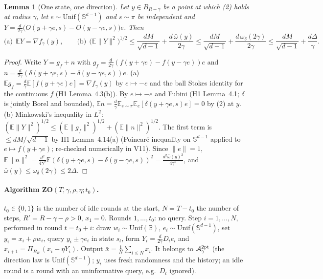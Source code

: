 \documentclass[11pt,a4paper]{article}
\numberwithin{equation}{section}
\newtheorem{lemma}[theorem]{Lemma}
\theoremstyle{definition}
\theoremstyle{remark}
\newcommand{\E}{\mathbb E}\newcommand{\R}{\mathbb R}\newcommand{\Z}{\mathbb Z}\newcommand{\Prob}{\mathbb P}
\newcommand{\norm}[1]{\lVert #1\rVert}\newcommand{\abs}[1]{\lvert #1\rvert}\newcommand{\ip}[2]{\langle #1,#2\rangle}
\newcommand{\Unif}{\mathrm{Unif}}\newcommand{\TV}{\mathrm{TV}}\newcommand{\BC}{\mathrm{BC}}\newcommand{\tmix}{t_{\rm mix}}
\newcommand{\Sph}{\mathbb S^{d-1}}\newcommand{\Ball}{\mathbb B}\newcommand{\iid}{\mathrm{iid}}
\newcommand{\wbar}{\bar\omega}\newcommand{\Atwo}{\cA^{\rm 2pt}_\gamma}
\begin{document}
\begin{lemma}[One state, one direction]\label{lem:mom}
Let $y\in B_{R-\gamma}$ be a point at which (2) holds at radius $\gamma$, let $e\sim\Unif(\Sph)$ and $s\sim\pi$ be independent and $Y=\frac d{2\gamma}\big(O(y+\gamma e,s)-O(y-\gamma e,s)\big)e$. Then
\[
\text{(a)}\ \ \E Y=\nabla f_\gamma(y),\qquad\text{(b)}\ \ \big(\E\norm Y^2\big)^{1/2}\le\frac{dM}{\sqrt{d-1}}+\frac{d\,\wbar(y)}{2\gamma}\le\frac{dM}{\sqrt{d-1}}+\frac{d\,\omega_\delta(2\gamma)}{2\gamma}\le \frac{dM}{\sqrt{d-1}}+\frac{d\Delta}{\gamma}.
\]
\end{lemma}
\begin{proof}
Write $Y=g_f+n$ with $g_f=\frac d{2\gamma}(f(y+\gamma e)-f(y-\gamma e))e$ and $n=\frac d{2\gamma}(\delta(y+\gamma e,s)-\delta(y-\gamma e,s))e$.
(a) $\E g_f=\frac d\gamma\E[f(y+\gamma e)e]=\nabla f_\gamma(y)$ by $e\mapsto-e$ and the ball Stokes identity for the continuous $f$ (H1 Lemma~4.3(b)). By $e\mapsto-e$ and Fubini (H1 Lemma~4.1; $\delta$ is jointly Borel and bounded), $\E n=\frac d\gamma\E_{s\sim\pi}\E_e[\delta(y+\gamma e,s)e]=0$ by (2) at $y$.
(b) Minkowski's inequality in $L^2$: $(\E\norm Y^2)^{1/2}\le(\E\norm{g_f}^2)^{1/2}+(\E\norm n^2)^{1/2}$. The first term is $\le dM/\sqrt{d-1}$ by H1 Lemma~4.14(a) (Poincar\'e inequality on $\Sph$ applied to $e\mapsto f(y+\gamma e)$; re-checked numerically in V11). Since $\norm e=1$, $\E\norm n^2=\frac{d^2}{4\gamma^2}\E(\delta(y+\gamma e,s)-\delta(y-\gamma e,s))^2=\frac{d^2\wbar(y)^2}{4\gamma^2}$, and $\wbar(y)\le\omega_\delta(2\gamma)\le2\Delta$.
\end{proof}

\paragraph{Algorithm ZO$(T,\gamma,\rho,\eta;t_0)$.} $t_0\in\{0,1\}$ is the number of idle rounds at the start, $N=T-t_0$ the number of steps, $R'=R-\gamma-\rho>0$, $x_1=0$. Rounds $1,\dots,t_0$: no query. Step $i=1,\dots,N$, performed in round $t=t_0+i$: draw $w_i\sim\Unif(\Ball)$, $e_i\sim\Unif(\Sph)$, set $y_i=x_i+\rho w_i$, query $y_i\pm\gamma e_i$ in state $s_t$, form $Y_i=\frac d{2\gamma}D_ie_i$ and $x_{i+1}=\Pi_{B_{R'}}(x_i-\eta Y_i)$. Output $\bar x=\frac1N\sum_{i\le N}x_i$. It belongs to $\Atwo$ (the direction law is $\Unif(\Sph)$; $y_i$ uses fresh randomness and the history; an idle round is a round with an uninformative query, e.g.\ $D_t$ ignored).
\end{document}
